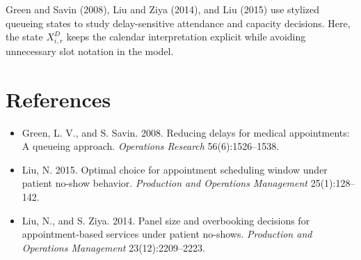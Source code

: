 \documentclass[11pt]{article}
\begin{document}
Green and Savin (2008), Liu and Ziya (2014), and Liu (2015) use stylized queueing states to study
delay-sensitive attendance and capacity decisions. Here, the state \(X_{i,r}^{D}\) keeps the
calendar interpretation explicit while avoiding unnecessary slot notation in the model.

\section{References}

\begin{itemize}[itemsep=0.25em]
    \item Green, L. V., and S. Savin. 2008. Reducing delays for medical appointments: A queueing approach. \emph{Operations Research} 56(6):1526--1538.
    \item Liu, N. 2015. Optimal choice for appointment scheduling window under patient no-show behavior. \emph{Production and Operations Management} 25(1):128--142.
    \item Liu, N., and S. Ziya. 2014. Panel size and overbooking decisions for appointment-based services under patient no-shows. \emph{Production and Operations Management} 23(12):2209--2223.
\end{itemize}
\end{document}
